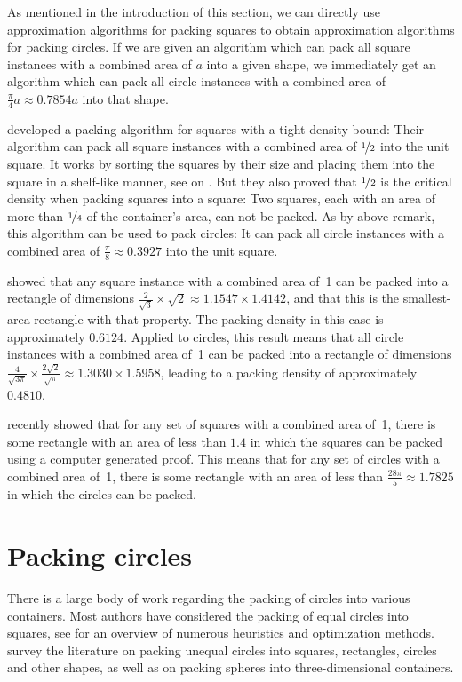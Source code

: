 \documentclass[a4paper,style=print,bibliography=totoc,nexus,lnum,extramargin]{tubsbook}
\begin{document}
As mentioned in the introduction of this section, we can directly use approximation algorithms for packing squares to obtain approximation algorithms for packing circles.
If we are given an algorithm which can pack all square instances with a combined area of $a$ into a given shape, we immediately get an algorithm which can pack all circle instances with a combined area of $\frac{\pi}{4}a \approx 0.7854a$ into that shape. 

\textcite{MM1967some} developed a packing algorithm for squares with a tight density bound: Their algorithm can pack all square instances with a combined area of $\nicefrac{1}{2}$ into the unit square.
It works by sorting the squares by their size and placing them into the square in a shelf-like manner, see  on .
But they also proved that $\nicefrac{1}{2}$ is the critical density when packing squares into a square: Two squares, each with an area of more than $\nicefrac{1}{4}$ of the container's area, can not be packed.
As by above remark, this algorithm can be used to pack circles: It can pack all circle instances with a combined area of $\frac{\pi}{8} \approx 0.3927$ into the unit square.

\textcite{KK1975optimal} showed that any square instance with a combined area of~1 can be packed into a rectangle of dimensions $\frac{2}{\sqrt{3}} \times \sqrt{2} \approx 1.1547 \times 1.4142$, and that this is the smallest-area rectangle with that property. The packing density in this case is approximately $0.6124$. Applied to circles, this result means that all circle instances with a combined area of~1 can be packed into a rectangle of dimensions $\frac{4}{\sqrt{3\pi}} \times \frac{2\sqrt{2}}{\sqrt{\pi}} \approx 1.3030 \times 1.5958$, leading to a packing density of approximately $0.4810$.

\textcite{hougardy2011packing} recently showed that for any set of squares with a combined area of~1, there is some rectangle with an area of less than $1.4$ in which the squares can be packed using a computer generated proof. This means that for any set of circles with a combined area of~1, there is some rectangle with an area of less than $\frac{28\pi}{5} \approx 1.7825$ in which the circles can be packed.

\section{Packing circles}

There is a large body of work regarding the packing of circles into various containers. Most authors have considered the packing of equal circles into squares, see \textcite{SMCSCG2007new} for an overview of numerous heuristics and optimization methods. \textcite{HM2009literature} survey the literature on packing unequal circles into squares, rectangles, circles and other shapes, as well as on packing spheres into three-dimensional containers.
\end{document}
